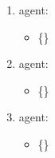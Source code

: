 \begin{enumerate}
\item agent: \agentA{}\begin{itemize}\item \{\sitey{}{}\}\end{itemize}
\item agent: \agentB{}\begin{itemize}\item \{\sitexun{}{}\sitesep\sitexdeux{}{}\}\end{itemize}
\item agent: \agentC{}\begin{itemize}\item \{\sitez{}{}\}\end{itemize}
\end{enumerate}
